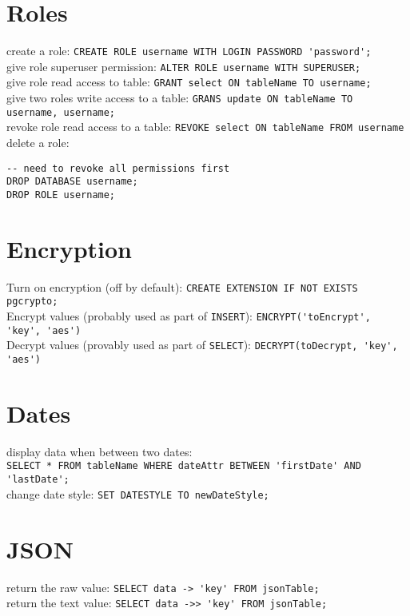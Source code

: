 \documentclass[a4paper,11pt]{article}
\begin{document}
\section{Roles}
create a role: \verb|CREATE ROLE username WITH LOGIN PASSWORD 'password';|\\
give role superuser permission: \verb|ALTER ROLE username WITH SUPERUSER;|\\
give role read access to table: \verb|GRANT select ON tableName TO username;|\\
give two roles write access to a table: \verb|GRANS update ON tableName TO username, username;|\\
revoke role read access to a table: \verb|REVOKE select ON tableName FROM username|\\
delete a role:
\begin{verbatim}
-- need to revoke all permissions first
DROP DATABASE username;
DROP ROLE username;
\end{verbatim}

\section{Encryption}
Turn on encryption (off by default): \verb|CREATE EXTENSION IF NOT EXISTS pgcrypto;|\\
Encrypt values (probably used as part of \verb|INSERT|): \verb|ENCRYPT('toEncrypt', 'key', 'aes')|\\
Decrypt values (provably used as part of \verb|SELECT|): \verb|DECRYPT(toDecrypt, 'key', 'aes')|

\section{Dates}
display data when between two dates:\\
\verb|SELECT * FROM tableName WHERE dateAttr BETWEEN 'firstDate' AND 'lastDate';|\\
change date style: \verb|SET DATESTYLE TO newDateStyle;|

\section{JSON}
return the raw value: \verb|SELECT data -> 'key' FROM jsonTable;|\\
return the text value: \verb|SELECT data ->> 'key' FROM jsonTable;|
\end{document}
